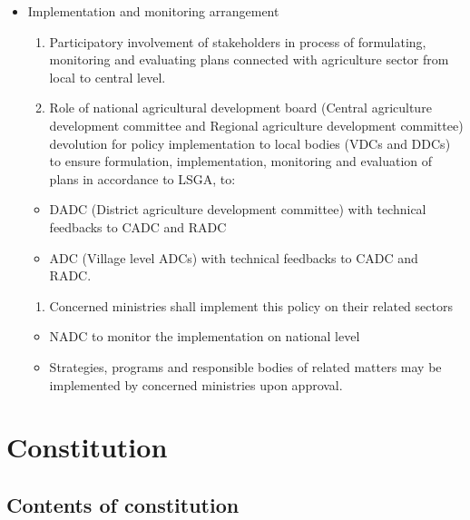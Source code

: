 \documentclass[
  openany]{book}
\providecommand{\tightlist}{%
  \setlength{\itemsep}{0pt}\setlength{\parskip}{0pt}}
\begin{document}
\begin{itemize}
\tightlist
\item
  Implementation and monitoring arrangement

  \begin{enumerate}
  \def\labelenumi{\arabic{enumi}.}
  \tightlist
  \item
    Participatory involvement of stakeholders in process of formulating, monitoring and evaluating plans connected with agriculture sector from local to central level.
  \item
    Role of national agricultural development board (Central agriculture development committee and Regional agriculture development committee) devolution for policy implementation to local bodies (VDCs and DDCs) to ensure formulation, implementation, monitoring and evaluation of plans in accordance to LSGA, to:
  \end{enumerate}

  \begin{itemize}
  \tightlist
  \item
    DADC (District agriculture development committee) with technical feedbacks to CADC and RADC
  \item
    ADC (Village level ADCs) with technical feedbacks to CADC and RADC.
  \end{itemize}

  \begin{enumerate}
  \def\labelenumi{\arabic{enumi}.}
  \setcounter{enumi}{2}
  \tightlist
  \item
    Concerned ministries shall implement this policy on their related sectors
  \end{enumerate}

  \begin{itemize}
  \tightlist
  \item
    NADC to monitor the implementation on national level
  \item
    Strategies, programs and responsible bodies of related matters may be implemented by concerned ministries upon approval.
  \end{itemize}
\end{itemize}

\hypertarget{constitution}{%
\chapter{Constitution}\label{constitution}}

\hypertarget{contents-of-constitution}{%
\section{Contents of constitution}\label{contents-of-constitution}}
\end{document}
